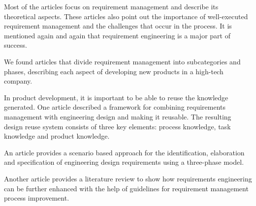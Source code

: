     Most of the articles focus on requirement management and describe its theoretical aspects. These articles also point out the importance of well-executed requirement management and the challenges that occur in the process. It is mentioned again and again that requirement engineering is a major part of success.

    We found articles that divide requirement management into subcategories and phases, describing each aspect of developing new products in a high-tech company.~\cite{Ahti2005}

    In product development, it is important to be able to reuse the knowledge generated. One article described a framework for combining requirements management with engineering design and making it reusable. The resulting design reuse system consists of three key elements: process knowledge, task knowledge and product knowledge.~\cite{BAXTER2008585}

    An article provides a scenario based approach for the identification, elaboration and specification of engineering design requirements using a three-phase model.~\cite{liu2012scenario}


    Another article provides a literature review to show how requirements engineering can be further enhanced with the help of guidelines for requirement management process improvement.~\cite{Kauppinen2005}

